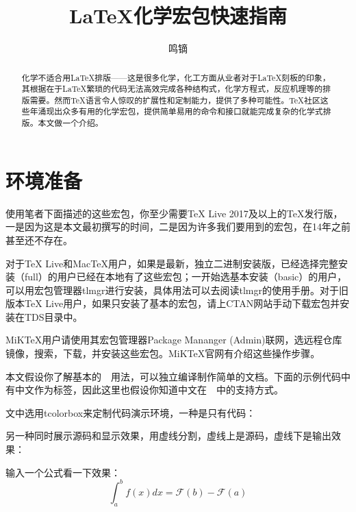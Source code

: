 \documentclass[a4paper,UTF8,zihao = -4]{ctexart} %
\title{\textsf{\LaTeX}\heiti 化学宏包快速指南}
\author{\fangsong 鸣镝}
\date{\oldstylenums{2018/04/23}}
\begin{document}
\pagecolor{lightmilkyellow}

\maketitle %

\begin{abstract} 化学不适合用\LaTeX{}排版——这是很多化学，化工方面从业者对于\LaTeX{}刻板的印象，其根据在于\LaTeX{}繁琐的代码无法高效完成各种结构式，化学方程式，反应机理等的排版需要。然而\TeX{}语言令人惊叹的扩展性和定制能力，提供了多种可能性。\TeX{}社区这些年涌现出众多有用的化学宏包，提供简单易用的命令和接口就能完成复杂的化学式排版。本文做一个介绍。
\end{abstract}

\section{环境准备}
\label{sec:envimtPrep}

使用笔者下面描述的这些宏包，你至少需要\TeX{} Live 2017及以上的\TeX{}发行版，一是因为这是本文最初撰写的时间，二是因为许多我们要用到的宏包，在14年之前甚至还不存在。

对于\TeX{} Live和Mac\TeX{}用户，如果是最新，独立二进制安装版，已经选择完整安装（full）的用户已经在本地有了这些宏包；一开始选基本安装（basic）的用户，可以用宏包管理器\textsf{tlmgr}进行安装，具体用法可以去阅读\textsf{tlmgr}的使用手册。对于旧版本\TeX{} Live用户，如果只安装了基本的宏包，请上CTAN网站手动下载宏包并安装在TDS目录中。

MiK\TeX{}用户请使用其宏包管理器\textsf{Package Mananger (Admin)}联网，选远程仓库镜像，搜索，下载，并安装这些宏包。MiK\TeX{}官网有介绍这些操作步骤。

本文假设你了解基本的~\LaTeXe{}~用法，可以独立编译制作简单的文档。下面的示例代码中有中文作为标签，因此这里也假设你知道中文在~\LaTeXe{}~中的支持方式。

文中选用\textsf{tcolorbox}来定制代码演示环境，一种是只有代码：

\begin{dispListing}
\usepackage{tcolorbox} %
\end{dispListing}

另一种同时展示源码和显示效果，用虚线分割，虚线上是源码，虚线下是输出效果：

\begin{dispExample}
输入一个公式看一下效果：\[ \int _a^b f(x)dx = \mathcal{F}(b) - \mathcal{F}(a) \]
\end{dispExample}
\end{document}
